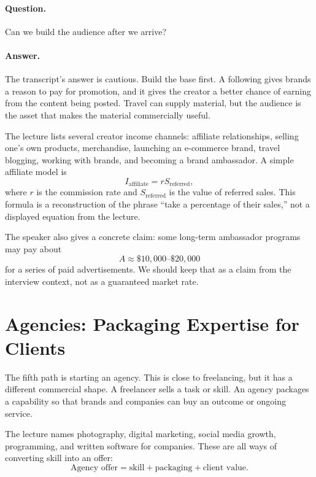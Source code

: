 \paragraph{Question.}
Can we build the audience after we arrive?

\paragraph{Answer.}
The transcript's answer is cautious. Build the base first. A following gives brands a reason to pay for promotion, and it gives the creator a better chance of earning from the content being posted. Travel can supply material, but the audience is the asset that makes the material commercially useful.

The lecture lists several creator income channels: affiliate relationships, selling one's own products, merchandise, launching an e-commerce brand, travel blogging, working with brands, and becoming a brand ambassador. A simple affiliate model is
\begin{equation}
I_{\mathrm{affiliate}} = r S_{\mathrm{referred}},
\end{equation}
where \(r\) is the commission rate and \(S_{\mathrm{referred}}\) is the value of referred sales. This formula is a reconstruction of the phrase ``take a percentage of their sales,'' not a displayed equation from the lecture.

The speaker also gives a concrete claim: some long-term ambassador programs may pay about
\begin{equation}
A \approx \$10{,}000\text{--}\$20{,}000
\end{equation}
for a series of paid advertisements. We should keep that as a claim from the interview context, not as a guaranteed market rate.

\section{Agencies: Packaging Expertise for Clients}

The fifth path is starting an agency. This is close to freelancing, but it has a different commercial shape. A freelancer sells a task or skill. An agency packages a capability so that brands and companies can buy an outcome or ongoing service.

The lecture names photography, digital marketing, social media growth, programming, and written software for companies. These are all ways of converting skill into an offer:
\begin{equation}
\text{Agency offer}
=
\text{skill}
+
\text{packaging}
+
\text{client value}.
\end{equation}

